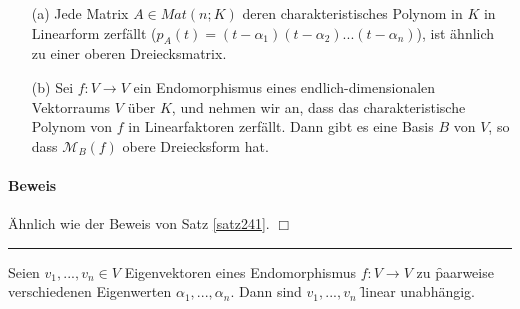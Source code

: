 \begin{satz} %
\label{satz242}
\begin{itemize}
\item[(a)] Jede Matrix $A \in Mat(n;K)$ deren charakteristisches Polynom in $K$ in Linearform zerfällt ($p_A(t) = (t- \alpha_1)(t- \alpha_2) ... (t - \alpha_n)$), ist ähnlich zu einer oberen Dreiecksmatrix.
\item[(b)] Sei $f: V \rightarrow V$ ein Endomorphismus eines endlich-dimensionalen Vektorraums $V$ über $K$, und nehmen wir an, dass das charakteristische Polynom von $f$ in Linearfaktoren zerfällt. Dann gibt es eine Basis $B$ von $V$, so dass $\mathcal{M}_B(f)$ obere Dreiecksform hat.
\end{itemize}
\end{satz}

\paragraph{Beweis}
Ähnlich wie der Beweis von Satz \ref{satz241}. \hfill $\Box$
\vspace*{0.2cm} \\ \rule{\linewidth}{0.3mm}\vspace*{0.1cm}

\begin{satz} %
\label{satz243}
Seien $v_1, ..., v_n \in V$ Eigenvektoren eines Endomorphismus $f: V \rightarrow V$ zu \f{paarweise verschiedenen} Eigenwerten $\alpha_1, ..., \alpha_n$. Dann sind $v_1, ..., v_n$ \f{linear unabhängig}.
\end{satz}

